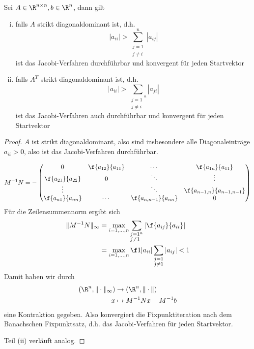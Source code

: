 \documentclass[a4paper]{scrartcl}
\numberwithin{equation}{section}
\begin{document}
\begin{st}
	\label{st:4.8}
	Sei $A\in \R^{n\times n}, b\in \R^n$, dann gilt
	\begin{enumerate}[(i)]
		\item
			falls $A$ strikt diagonaldominant ist, d.h.
			\[
				|a_{ii}| > \sum_{\substack{j=1\\j\neq i}}^n|a_{ij}|
			\]
			ist das Jacobi-Verfahren durchführbar und konvergent für jeden Startvektor
		\item
			falls $A^T$ strikt diagonaldominant ist, d.h.
			\[
				|a_{ii}| > \sum_{\substack{j=1\\j\neq i}^n}|a_{ji}|
			\]
			ist das Jacobi-Verfahren auch durchführbar und konvergent für jeden Startvektor
	\end{enumerate}
	\begin{proof}
		$A$ ist strikt diagonaldominant, also sind insbesondere alle Diagonaleinträge $a_{ii}>0$, also ist das Jacobi-Verfahren durchführbar.

		\[
			M^{-1}N = -\begin{pmatrix}
				0 & \f {a_{12}}{a_{11}} &  \cdots & \f {a_{1n}}{a_{11}}\\
				\f {a_{21}}{a_{22}} & 0 & \ddots  & \vdots\\
				
				\vdots & & \ddots & \f {a_{n-1,n}}{a_{n-1,n-1}}\\
				\f {a_{n1}}{a_{nn}} & \cdots &  \f {a_{n,n-1}}{a_{nn}} & 0
			\end{pmatrix}
		\]
		Für die Zeilensummennorm ergibt sich
		\begin{align*}
			\|M^{-1}N\|_\infty 
				&= \max_{i=1,\dotsc,n} \sum_{\substack{j=1\\j\neq 1}^n}\left|\f {a_{ij}}{a_{ii}}\right| \\
     			&= \max_{i=1,\dotsc,n} \f 1{|a_{ii}|} \sum_{\substack{j=1\\j\neq 1}}|a_{ij}| < 1
		\end{align*}
		Damit haben wir durch
		\begin{align*}
			(\R^n, \|\cdot\|_{\infty}) &\to (\R^n, \|\cdot\|)\\
			x & \mapsto M^{-1}Nx + M^{-1}b
		\end{align*}
		eine Kontraktion gegeben.
		Also konvergiert die Fixpunktiteration nach dem Banachschen Fixpunktsatz, d.h. das Jacobi-Verfahren für jeden Startvektor.

		Teil (ii) verläuft analog.
	\end{proof}
\end{st}
\end{document}
